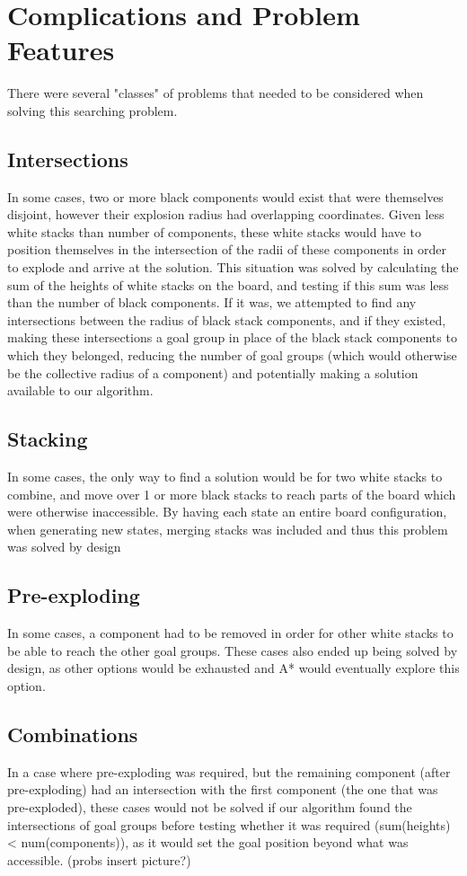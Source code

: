 \documentclass[11pt]{article}
\begin{document}
    \section{Complications and Problem Features}\label{sec:complications-and-problem-features}
    There were several "classes" of problems that needed to be considered when solving this searching problem.
    \subsection{Intersections}\label{subsec:intersections}
    In some cases, two or more black components would exist that were themselves disjoint, however their explosion radius
    had overlapping coordinates.
    Given less white stacks than number of components, these white stacks would have to position themselves in the
    intersection of the radii of these components in order to explode and arrive at the solution.
    This situation was solved by calculating the sum of the heights of white stacks on the board, and testing if this sum
    was less than the number of black components.
    If it was, we attempted to find any intersections between the radius of black stack components, and if they existed,
    making these intersections a goal group in place of the black stack components to which they belonged, reducing
    the number of goal groups (which would otherwise be the collective radius of a component) and potentially making a
    solution available to our algorithm.
    \subsection{Stacking}\label{subsec:stacking}
    In some cases, the only way to find a solution would be for two white stacks to combine, and move over 1 or more
    black stacks to reach parts of the board which were otherwise inaccessible.
    By having each state an entire board configuration, when generating new states, merging stacks was included and thus
    this problem was solved by design
    \subsection{Pre-exploding}\label{subsec:pre-exploding}
    In some cases, a component had to be removed in order for other white stacks to be able to reach the other goal
    groups.
    These cases also ended up being solved by design, as other options would be exhausted and A* would eventually
    explore this option.
    \subsection{Combinations}\label{subsec:combinations}
    In a case where pre-exploding was required, but the remaining component (after pre-exploding) had an intersection
    with the first component (the one that was pre-exploded), these cases would not be solved if our algorithm found
    the intersections of goal groups before testing whether it was required (sum(heights) < num(components)), as it
    would set the goal position beyond what was accessible.
    (probs insert picture?)
\end{document}
